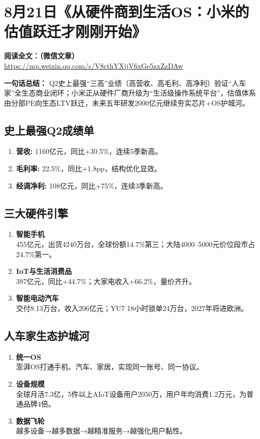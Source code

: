 \clearpage

\section{8月21日《从硬件商到生活OS：小米的估值跃迁才刚刚开始》}

\vspace{1cm}
\noindent\textbf{阅读全文：（微信文章）} \url{https://mp.weixin.qq.com/s/V8cthYXjjV6xGe5zxZzDAw}

\textbf{一句话总结：}  
Q2史上最强“三高”业绩（高营收、高毛利、高净利）验证“人车家”全生态商业闭环；小米正从硬件厂商升级为{\color{red}“生活级操作系统平台”}，估值体系由分部PE向生态LTV跃迁，未来五年研发2000亿元继续夯实芯片+OS护城河。

\subsection{史上最强Q2成绩单}
\begin{enumerate}[leftmargin=*, nosep]
    \item \textbf{营收:} 1160亿元，同比+30.5\%，连续5季新高。  
    \item \textbf{毛利率:} 22.5\%，同比+1.8{\color{red}pp}，结构优化显效。  
    \item \textbf{经调净利:} 108亿元，同比+75\%，连续3季新高。  
\end{enumerate}

\subsection{三大硬件引擎}
\begin{enumerate}[leftmargin=*, nosep]
    \item \textbf{智能手机} \\
    455亿元，出货4240万台，全球份额14.7\%第三；大陆4000–5000元价位段市占24.7\%第一。  
    \item \textbf{IoT与生活消费品} \\
    387亿元，同比+44.7\%；大家电收入+66.2\%，量价齐升。  
    \item \textbf{智能电动汽车} \\
    交付8.13万台，收入206亿元；YU7 18小时锁单24万台，2027年将进欧洲。  
\end{enumerate}

\subsection{人车家生态护城河}
\begin{enumerate}[leftmargin=*, nosep]
    \item \textbf{统一OS} \\
    澎湃OS打通手机、汽车、家居，实现同一账号、同一协议。  
    \item \textbf{设备规模} \\
    全球月活7.3亿，5件以上AIoT设备用户2050万，用户年均消费1.2万元，为普通品牌4倍。  
    \item \textbf{数据飞轮} \\
    越多设备→越多数据→越精准服务→越强化用户黏性。  
\end{enumerate}

